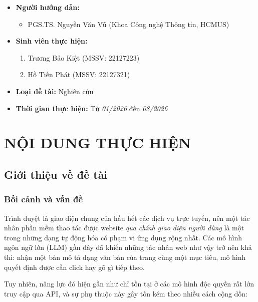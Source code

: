 \documentclass[14pt]{article}
\begin{document}
\begin{itemize}[leftmargin=1.5cm, label=\textbullet]
    \item \textbf{Người hướng dẫn:}
    \begin{itemize}[label=--]
        \item PGS.TS. Nguyễn Văn Vũ (Khoa Công nghệ Thông tin, HCMUS)
    \end{itemize}

    \item \textbf{Sinh viên thực hiện:}
    \begin{enumerate}[label=\arabic*.]
        \item Trương Bảo Kiệt (MSSV: 22127223)
        \item Hồ Tiến Phát (MSSV: 22127321)
    \end{enumerate}

    \item \textbf{Loại đề tài:} Nghiên cứu

    \item \textbf{Thời gian thực hiện:} Từ \textit{01/2026} đến \textit{08/2026}
\end{itemize}

\section{NỘI DUNG THỰC HIỆN}

\subsection{Giới thiệu về đề tài}

\subsubsection{Bối cảnh và vấn đề}

Trình duyệt là giao diện chung của hầu hết các dịch vụ trực tuyến, nên một tác nhân phần mềm thao tác được website \textit{qua chính giao diện người dùng} là một trong những dạng tự động hóa có phạm vi ứng dụng rộng nhất. Các mô hình ngôn ngữ lớn (LLM) gần đây đã khiến những tác nhân web như vậy trở nên khả thi: nhận một bản mô tả dạng văn bản của trang cùng một mục tiêu, mô hình quyết định được cần click hay gõ gì tiếp theo.

Tuy nhiên, năng lực đó hiện gần như chỉ tồn tại ở các mô hình độc quyền rất lớn truy cập qua API, và sự phụ thuộc này gây tốn kém theo nhiều cách cộng dồn:
\end{document}
